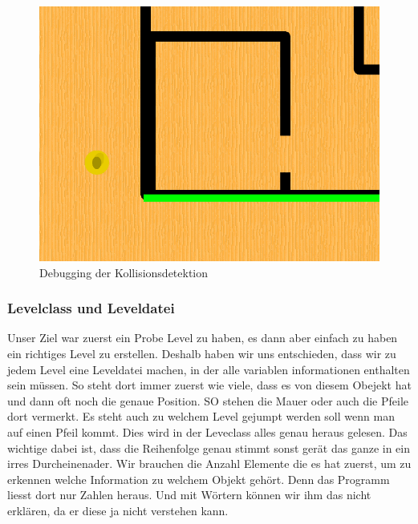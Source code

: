 \documentclass[12pt,a4paper]{scrartcl}
\begin{document}
\begin{figure}[h]
\centering
\includegraphics[scale=0.3]{img/kollisionsdetektion.png}
\caption{Debugging der Kollisionsdetektion}
\end{figure}

\subsubsection{Levelclass und Leveldatei}
Unser Ziel war zuerst ein Probe Level zu haben, es dann aber einfach zu haben ein richtiges Level zu erstellen. Deshalb haben wir uns entschieden, dass wir zu jedem Level eine Leveldatei machen, in der alle variablen informationen enthalten sein müssen. So steht dort immer zuerst wie viele, dass es von diesem Obejekt hat und dann oft noch die genaue Position. SO stehen die Mauer oder auch die Pfeile dort vermerkt. Es steht auch zu welchem Level gejumpt werden soll wenn man auf einen Pfeil kommt.
Dies wird in der Leveclass alles genau heraus gelesen. Das wichtige dabei ist, dass die Reihenfolge genau stimmt sonst gerät das ganze in ein irres Durcheinenader. Wir brauchen die Anzahl Elemente die es hat zuerst, um zu erkennen welche Information zu welchem Objekt gehört. Denn das Programm liesst dort nur Zahlen heraus. Und mit Wörtern können wir ihm das nicht erklären, da er diese ja nicht verstehen kann. 
\end{document}
